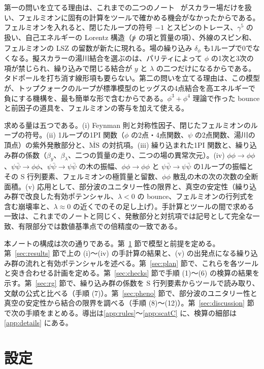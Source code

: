 \documentclass[a4paper,10pt]{ltjsarticle}
\newcommand{\MSbar}{\overline{\mathrm{MS}}}
\begin{document}
第一の問いを立てる理由は、これまでの二つのノート~\cite{phi3note,phi34note} がスカラー場だけを扱い、フェルミオンに固有の計算をツールで確かめる機会がなかったからである。フェルミオンを入れると、閉じたループの符号 $-1$ とスピンのトレース、$\gamma^5$ の扱い、自己エネルギーの Lorentz 構造（$\slashed p$ の項と質量の項）、外線のスピン和、フェルミオンの LSZ の留数が新たに現れる。場の繰り込み $\delta_\phi$ も1ループで0でなくなる。擬スカラーの湯川結合を選ぶのは、パリティによって $\phi$ の1次と3次の項が禁じられ、繰り込みで閉じる結合が $y$ と $\lambda$ の二つだけになるからである。タドポールを打ち消す線形項も要らない。第二の問いを立てる理由は、この模型が、トップクォークのループが標準模型のヒッグスの4点結合を高エネルギーで負にする機構を、最も簡単な形で含むからである。$\phi^3+\phi^4$ 理論で作った bounce と前因子の道具を、フェルミオンの寄与を加えて使える。

求める量は五つである。(i) Feynman 則と対称性因子、閉じたフェルミオンのループの符号。(ii) 1ループの1PI 関数（$\phi$ の2点・4点関数、$\psi$ の2点関数、湯川の頂点）の紫外発散部分と、$\MSbar$ の対抗項。(iii) 繰り込まれた1PI 関数と、繰り込み群の係数（$\beta_y$、$\beta_\lambda$、二つの質量の走り、二つの場の異常次元）。(iv) $\phi\phi\to\phi\phi$、$\psi\bar\psi\to\phi\phi$、$\psi\bar\psi\to\psi\bar\psi$ の木の振幅、$\phi\phi\to\phi\phi$ と $\psi\bar\psi\to\psi\bar\psi$ の1ループの振幅とその S 行列要素、フェルミオンの極質量と留数、$\phi\phi$ 散乱の木の次の次数の全断面積。(v) 応用として、部分波のユニタリー性の限界と、真空の安定性（繰り込み群で改良した有効ポテンシャル、$\lambda<0$ の bounce、フェルミオンの行列式を含む崩壊率と、$\lambda\approx0$ の近くでのその足し上げ）。手計算とツールの間で求める一致は、これまでのノートと同じく、発散部分と対抗項では記号として完全な一致、有限部分では数値基準点での倍精度の一致である。

本ノートの構成は次の通りである。第~\ref{sec:setup} 節で模型と前提を定める。第~\ref{sec:results} 節で上の (i)〜(iv) の手計算の結果と、(v) の出発点になる繰り込み群の流れと有効ポテンシャルを述べる。第~\ref{sec:plan} 節で、これらを各ツールと突き合わせる計画を定める。第~\ref{sec:checks} 節で手順 (1)〜(6) の検算の結果を示す。第~\ref{sec:rg} 節で、繰り込み群の係数を S 行列要素からツールで読み取り、文献の公式と比べる（手順 (7)）。第~\ref{sec:pheno} 節で、部分波のユニタリー性と真空の安定性から結合の限界を調べる（手順 (8)〜(12)）。第~\ref{sec:discussion} 節で次の手順をまとめる。導出は\ref{app:rules}〜\ref{app:scatC} に、検算の細部は\ref{app:details} にある。

\section{設定}\label{sec:setup}
\end{document}
